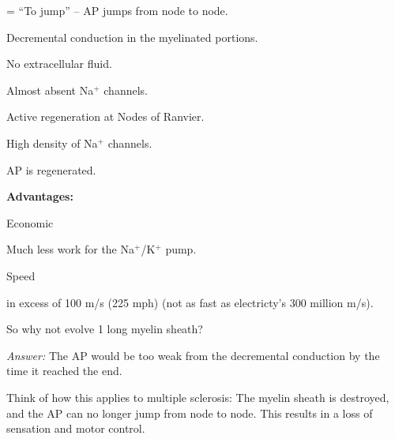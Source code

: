 \begin{coloredlist}
    \item {} = ``To jump'' -- AP jumps from node to node.
    \begin{coloredlist}
        \item Decremental conduction in the myelinated portions.
        \begin{coloredlist}
            \item No extracellular fluid.
            \item Almost absent Na\(^+\) channels.
        \end{coloredlist}
        \item Active regeneration at Nodes of Ranvier.
        \begin{coloredlist}
            \item High density of Na\(^+\) channels.
            \item AP is regenerated.
        \end{coloredlist}
        \item \textbf{Advantages:}
        \begin{coloredlist}
            \item Economic
            \begin{coloredlist}
                \item Much less work for the Na\(^+\)/K\(^+\) pump.
            \end{coloredlist}
            \item Speed
            \begin{coloredlist}
                \item in excess of 100 m/s (225 mph) (not as fast as electricty's 300 million m/s).
            \end{coloredlist}
            \item So why not evolve 1 long myelin sheath?
            \begin{coloredlist}
                \item \textit{Answer:} The AP would be too weak from the decremental conduction by the time it reached the end.
            \end{coloredlist}
        \end{coloredlist}
        \item Think of how this applies to multiple sclerosis: The myelin sheath is destroyed, and the AP can no longer jump from node to node. This results in a loss of sensation and motor control.
    \end{coloredlist}
\end{coloredlist}
